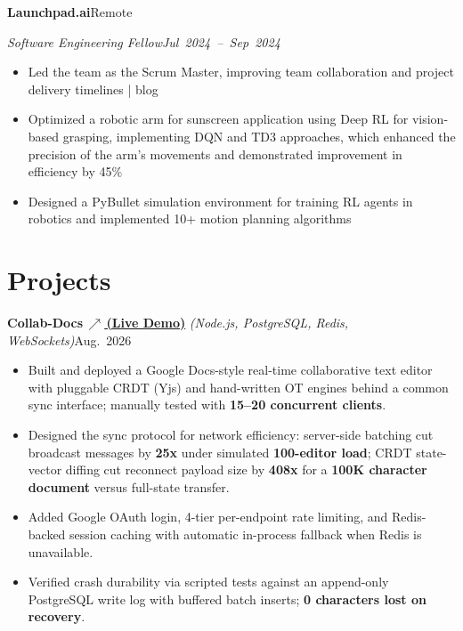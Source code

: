 \documentclass[10pt,letterpaper]{article}
\newcommand{\resumeHeading}[4]{%
  \par\noindent\textbf{#1}\hfill\mbox{#2}\par
  \noindent\textit{#3}\hfill\mbox{\textit{#4}}\par
}
\newcommand{\projectHeading}[3]{%
  \par\noindent\textbf{#1} \textit{(#2)}\hfill\mbox{#3}\par
}
\begin{document}
\resumeHeading{Launchpad.ai}{Remote}{Software Engineering Fellow}{Jul 2024 -- Sep 2024}
\begin{itemize}
\item Led the team as the Scrum Master, improving team collaboration and project delivery timelines | blog
\item Optimized a robotic arm for sunscreen application using Deep RL for vision-based grasping, implementing DQN and TD3 approaches, which enhanced the precision of the arm's movements and demonstrated improvement in efficiency by 45\%
\item Designed a PyBullet simulation environment for training RL agents in robotics and implemented 10+ motion planning algorithms
\end{itemize}


\section{Projects}
\projectHeading{Collab-Docs\,\href{https://collab-client-kvn5.onrender.com/}{\textnormal{\scriptsize$\nearrow$\,\normalsize (Live Demo)}}}{Node.js, PostgreSQL, Redis, WebSockets}{Aug. 2026}
\begin{itemize}
  \item Built and deployed a Google Docs-style real-time collaborative text editor with pluggable CRDT (Yjs) and hand-written OT engines behind a common sync interface; manually tested with \textbf{15--20 concurrent clients}.
  \item Designed the sync protocol for network efficiency: server-side batching cut broadcast messages by \textbf{25x} under simulated \textbf{100-editor load}; CRDT state-vector diffing cut reconnect payload size by \textbf{408x} for a \textbf{100K character document} versus full-state transfer.
  \item Added Google OAuth login, 4-tier per-endpoint rate limiting, and Redis-backed session caching with automatic in-process fallback when Redis is unavailable.
  \item Verified crash durability via scripted tests against an append-only PostgreSQL write log with buffered batch inserts; \textbf{0 characters lost on recovery}.
\end{itemize}
\end{document}
